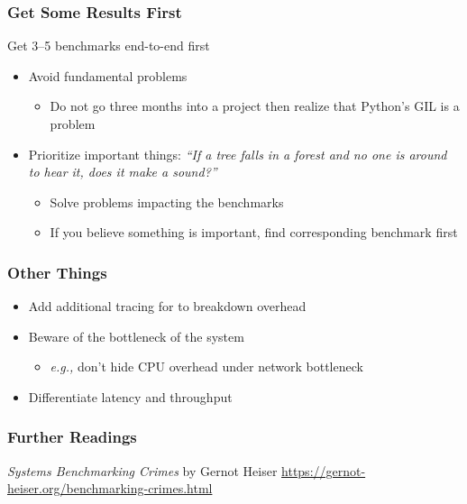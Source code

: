 \documentclass[xcolor={dvipsnames},aspectratio=149]{beamer}
\def\eg{\emph{e.g.,}\xspace}
\begin{document}
\begin{frame}
  \frametitle{Get Some Results First}
  Get 3--5 benchmarks end-to-end first
  \begin{itemize}
  \item Avoid fundamental problems
    \begin{itemize}
    \item Do not go three months into a project then realize that Python's GIL is a problem
    \end{itemize}
  \item Prioritize important things: \textit{``If a tree falls in a forest and no one is around to hear it, does it make a sound?''}

    \begin{itemize}
    \item Solve problems impacting the benchmarks
    \item If you believe something is important, find corresponding benchmark first
    \end{itemize}
  \end{itemize}
\end{frame}

\begin{frame}
  \frametitle{Other Things}
  \begin{itemize}
  \item Add additional tracing for to breakdown overhead
  \item Beware of the bottleneck of the system
    \begin{itemize}
    \item \eg don't hide CPU overhead under network bottleneck
    \end{itemize}
  \item Differentiate latency and throughput
  \end{itemize}
\end{frame}

\begin{frame}
  \frametitle{Further Readings}
    \textit{Systems Benchmarking Crimes} by Gernot Heiser \url{https://gernot-heiser.org/benchmarking-crimes.html}
\end{frame}
\end{document}
